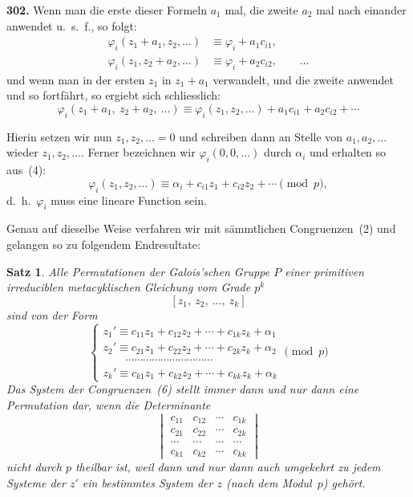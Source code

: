 \documentclass[12pt,a4paper]{article}
\newtheorem*{satz}{Satz}
\begin{document}
\bigskip
\noindent\textbf{302.} Wenn man die erste dieser Formeln $a_1$ mal, die zweite $a_2$ mal nach einander anwendet u.~s.~f., so folgt:
\[
\begin{aligned}
\varphi_i(z_1+a_1,z_2,\ldots) &\equiv \varphi_i + a_1 c_{i1},\\
\varphi_i(z_1,z_2+a_2,\ldots) &\equiv \varphi_i + a_2 c_{i2},\qquad\ldots
\end{aligned}
\]
und wenn man in der ersten $z_1$ in $z_1+a_1$ verwandelt, und die zweite anwendet und so fortf\"ahrt, so ergiebt sich schliesslich:
\begin{equation}
\tag{4}
\varphi_i(z_1+a_1,\ z_2+a_2,\ \ldots) \equiv \varphi_i(z_1,z_2,\ldots) + a_1 c_{i1} + a_2 c_{i2} + \cdots
\end{equation}

Hierin setzen wir nun $z_1,z_2,\ldots=0$ und schreiben dann an Stelle von $a_1,a_2,\ldots$ wieder $z_1,z_2,\ldots$. Ferner bezeichnen wir $\varphi_i(0,0,\ldots)$ durch $\alpha_i$ und erhalten so aus~(4):
\begin{equation}
\tag{5}
\varphi_i(z_1,z_2,\ldots) \equiv \alpha_i + c_{i1} z_1 + c_{i2} z_2 + \cdots \pmod p,
\end{equation}
d.~h.\ $\varphi_i$ muss eine lineare Function sein.

Genau auf dieselbe Weise verfahren wir mit s\"ammtlichen Congruenzen~(2) und gelangen so zu folgendem Endresultate:

\begin{satz}
Alle Permutationen der Galois'schen Gruppe $P$ einer primitiven irreduciblen metacyklischen Gleichung vom Grade $p^k$
\[
[z_1,\ z_2,\ \ldots,\ z_k]
\]
sind von der Form
\begin{equation}
\tag{6}
\begin{cases}
z_1' \equiv c_{11} z_1 + c_{12} z_2 + \cdots + c_{1k} z_k + \alpha_1\\
z_2' \equiv c_{21} z_1 + c_{22} z_2 + \cdots + c_{2k} z_k + \alpha_2\\
\qquad\cdots\cdots\cdots\cdots\cdots\cdots\cdots\cdots\cdots\cdots\\
z_k' \equiv c_{k1} z_1 + c_{k2} z_2 + \cdots + c_{kk} z_k + \alpha_k
\end{cases}
\pmod p
\end{equation}
Das System der Congruenzen~(6) stellt immer dann und nur dann eine Permutation dar, wenn die Determinante
\[
\begin{vmatrix}
c_{11} & c_{12} & \cdots & c_{1k}\\
c_{21} & c_{22} & \cdots & c_{2k}\\
\cdots & \cdots & \cdots & \cdots\\
c_{k1} & c_{k2} & \cdots & c_{kk}
\end{vmatrix}
\]
nicht durch $p$ theilbar ist, weil dann und nur dann auch umgekehrt zu jedem Systeme der $z'$ ein bestimmtes System der $z$ (nach dem Modul~$p$) geh\"ort.
\end{satz}
\end{document}
